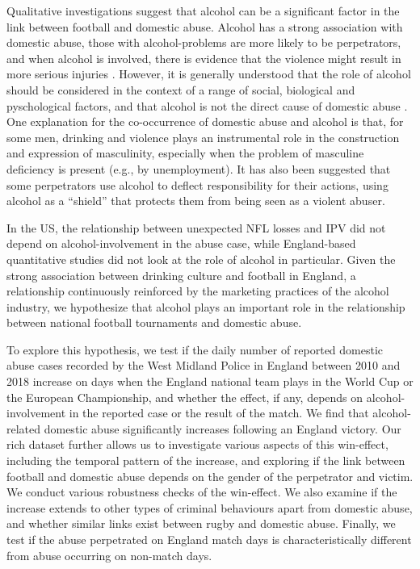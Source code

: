 \documentclass[12pt, letterpaper]{article}
\begin{document}
Qualitative investigations suggest that alcohol can be a significant factor in the link between football and domestic abuse. Alcohol has a strong association with domestic abuse, those with alcohol-problems are more likely to be perpetrators, and when alcohol is involved, there is evidence that the violence might result in more serious injuries \autocite{Peralta2010}. However, it is generally understood that the role of alcohol should be considered in the context of a range of social, biological and pyschological factors, and that alcohol is not the direct cause of domestic abuse \autocite{Javaid2015,Peralta2010}. One explanation for the co-occurrence of domestic abuse and alcohol is that, for some men, drinking and violence plays an instrumental role in the construction and expression of masculinity, especially when the problem of masculine deficiency is present (e.g., by unemployment)\autocite{Peralta2010}. It has also been suggested that some perpetrators use alcohol to deflect responsibility for their actions, using alcohol as a ``shield'' that protects them from being seen as a violent abuser\autocite{Javaid2015}.  

In the US, the relationship between unexpected NFL losses and IPV did not depend on alcohol-involvement in the abuse case\autocite{Card2011}, while England-based quantitative studies did not look at the role of alcohol in particular. Given the strong association between drinking culture and football in England\autocite{Dixon2014}, a relationship continuously reinforced by the marketing practices of the alcohol industry\autocite{Gornall2014}, we hypothesize that alcohol plays an important role in the relationship between national football tournaments and domestic abuse.

To explore this hypothesis, we test if the daily number of reported domestic abuse cases recorded by the West Midland Police in England between 2010 and 2018 increase on days when the England national team plays in the World Cup or the European Championship, and whether the effect, if any, depends on alcohol-involvement in the reported case or the result of the match. We find that alcohol-related domestic abuse significantly increases following an England victory. Our rich dataset further allows us to investigate various aspects of this win-effect, including the temporal pattern of the increase, and exploring if the link between football and domestic abuse depends on the gender of the perpetrator and victim. We conduct various robustness checks of the win-effect. We also examine if the increase extends to other types of criminal behaviours apart from domestic abuse, and whether similar links exist between rugby and domestic abuse. Finally, we test if the abuse perpetrated on England match days is characteristically different from abuse occurring on non-match days.
\end{document}
